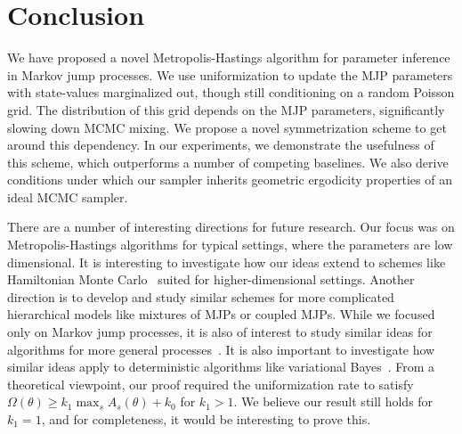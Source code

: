 \section{Conclusion}
We have proposed a novel Metropolis-Hastings algorithm for parameter 
inference in Markov jump processes. We use 
uniformization to update the MJP parameters with state-values marginalized 
out, though still conditioning on a random Poisson grid. The 
distribution of this grid depends on the MJP parameters, significantly 
slowing down MCMC mixing. We propose a novel symmetrization scheme to get 
around this dependency. In our experiments, we demonstrate the usefulness 
of this scheme, which outperforms a number of competing baselines.
We also derive conditions under which our sampler inherits geometric 
ergodicity properties of an ideal MCMC sampler.


There are a number of interesting directions for future research.
Our focus was on Metropolis-Hastings algorithms for typical settings,
where the parameters are low dimensional. It is interesting to 
investigate how our ideas extend to schemes like Hamiltonian Monte 
Carlo~\cite{Neal2010} suited for higher-dimensional settings. Another 
direction is to develop and study similar schemes for more complicated 
hierarchical models like mixtures of MJPs or coupled MJPs. While we 
focused only on Markov jump processes, it is also of interest to study 
similar ideas for algorithms for more general processes~\cite{RaoTeh12}. 
It is also important to investigate how similar ideas apply to 
deterministic algorithms like variational Bayes~\cite{Opper_varinf, panzharao17}. From 
a theoretical viewpoint, our proof required the uniformization rate to 
satisfy $\Omega(\theta) \ge k_1 \max_s A_s(\theta) + k_0$ for $k_1 > 1$. 
We believe our result still holds for $k_1 = 1$, and for completeness, 
it would be interesting to prove this.  
